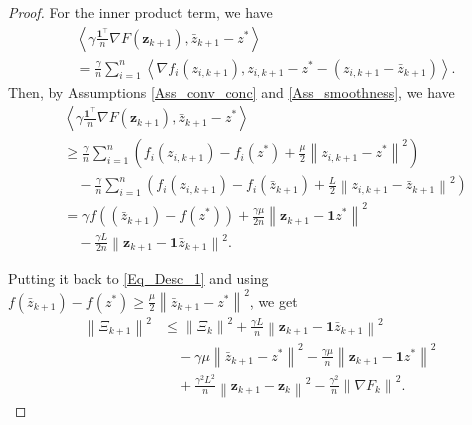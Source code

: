 \documentclass[10pt,a4paper]{amsart}
\begin{document}
\begin{proof}
For the inner product term, we have
\begin{equation*}
\begin{aligned}
&\left< \gamma \frac{\mathbf{1}^{\top}}{n}\nabla F\left( \mathbf{z}_{k+1} \right) ,\bar{z}_{k+1}-z^* \right> 
\\
&=\frac{\gamma}{n}\sum_{i=1}^n{\left< \nabla f_i\left( z_{i,k+1} \right) ,z_{i,k+1}-z^*-\left( z_{i,k+1}-\bar{z}_{k+1} \right) \right>}.
\end{aligned}
\end{equation*}
Then, by Assumptions \ref{Ass_conv_conc} and \ref{Ass_smoothness}, we have
\begin{equation*}
\begin{aligned}
&\left< \gamma \frac{\mathbf{1}^{\top}}{n}\nabla F\left( \mathbf{z}_{k+1} \right) ,\bar{z}_{k+1}-z^* \right> 
\\
&\geqslant \frac{\gamma}{n}\sum_{i=1}^n{\left( f_i\left( z_{i,k+1} \right) -f_i\left( z^* \right) +\frac{\mu}{2}\left\| z_{i,k+1}-z^* \right\| ^2 \right)}
\\
&\quad-\frac{\gamma}{n}\sum_{i=1}^n{\left( f_i\left( z_{i,k+1} \right) -f_i\left( \bar{z}_{k+1} \right) +\frac{L}{2}\left\| z_{i,k+1}-\bar{z}_{k+1} \right\| ^2 \right)}
\\
&=\gamma f\left( \left( \bar{z}_{k+1} \right) -f\left( z^* \right) \right) +\frac{\gamma \mu}{2n}\left\| \mathbf{z}_{k+1}-\mathbf{1}z^* \right\| ^2
\\
&\quad-\frac{\gamma L}{2n}\left\| \mathbf{z}_{k+1}-\mathbf{1}\bar{z}_{k+1} \right\| ^2.
\end{aligned}
\end{equation*}

Putting it back to \eqref{Eq_Desc_1} and using $f\left( \bar{z}_{k+1} \right) -f\left( z^* \right) \geqslant \frac{\mu}{2}\left\| \bar{z}_{k+1}-z^* \right\| ^2$, we get
\begin{equation*}
\begin{aligned}
\left\| \varXi _{k+1} \right\| ^2
&\leqslant \left\| \varXi _k \right\| ^2+\frac{\gamma L}{n}\left\| \mathbf{z}_{k+1}-\mathbf{1}\bar{z}_{k+1} \right\| ^2
\\
&\quad-\gamma \mu \left\| \bar{z}_{k+1}-z^* \right\| ^2-\frac{\gamma \mu}{n}\left\| \mathbf{z}_{k+1}-\mathbf{1}z^* \right\| ^2
\\
&\quad+\frac{\gamma ^2L^2}{n}\left\| \mathbf{z}_{k+1}-\mathbf{z}_k \right\| ^2-\frac{\gamma ^2}{n}\left\| \nabla F_k \right\| ^2.
\end{aligned}
\end{equation*}


\end{proof}
\end{document}
